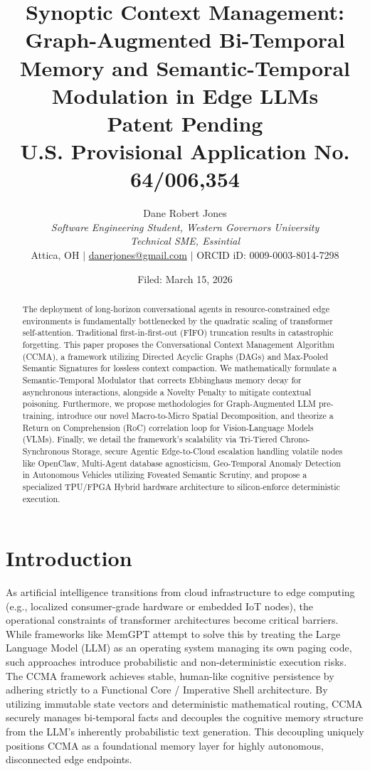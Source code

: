 \documentclass[11pt, a4paper]{article}
\title{
    \textbf{Synoptic Context Management: Graph-Augmented Bi-Temporal Memory and Semantic-Temporal Modulation in Edge LLMs} \\
    \vspace{0.5cm}
    \large \textbf{Patent Pending} \\
    \small U.S. Provisional Application No. 64/006,354
}
\author{
	Dane Robert Jones \\ 
	\textit{Software Engineering Student, Western Governors University} \\ 
	\textit{Technical SME, Essintial} \\
	Attica, OH $\vert$ \href{mailto:danerjones@gmail.com}{danerjones@gmail.com} $\vert$ ORCID iD: 0009-0003-8014-7298
}
\date{Filed: March 15, 2026}
\begin{document}
	
	\maketitle
	
	\begin{abstract}
		The deployment of long-horizon conversational agents in resource-constrained edge environments is fundamentally bottlenecked by the quadratic scaling of transformer self-attention. Traditional first-in-first-out (FIFO) truncation results in catastrophic forgetting. This paper proposes the Conversational Context Management Algorithm (CCMA), a framework utilizing Directed Acyclic Graphs (DAGs) and Max-Pooled Semantic Signatures for lossless context compaction. We mathematically formulate a Semantic-Temporal Modulator that corrects Ebbinghaus memory decay for asynchronous interactions, alongside a Novelty Penalty to mitigate contextual poisoning. Furthermore, we propose methodologies for Graph-Augmented LLM pre-training, introduce our novel Macro-to-Micro Spatial Decomposition, and theorize a Return on Comprehension (RoC) correlation loop for Vision-Language Models (VLMs). Finally, we detail the framework's scalability via Tri-Tiered Chrono-Synchronous Storage, secure Agentic Edge-to-Cloud escalation handling volatile nodes like OpenClaw, Multi-Agent database agnosticism, Geo-Temporal Anomaly Detection in Autonomous Vehicles utilizing Foveated Semantic Scrutiny, and propose a specialized TPU/FPGA Hybrid hardware architecture to silicon-enforce deterministic execution.
	\end{abstract}
	
	\vspace{0.5cm}
	
	\section{Introduction}
	As artificial intelligence transitions from cloud infrastructure to edge computing (e.g., localized consumer-grade hardware or embedded IoT nodes), the operational constraints of transformer architectures become critical barriers. While frameworks like MemGPT \cite{packer2023memgpt} attempt to solve this by treating the Large Language Model (LLM) as an operating system managing its own paging code, such approaches introduce probabilistic and non-deterministic execution risks. The CCMA framework achieves stable, human-like cognitive persistence by adhering strictly to a Functional Core / Imperative Shell architecture. By utilizing immutable state vectors and deterministic mathematical routing, CCMA securely manages bi-temporal facts and decouples the cognitive memory structure from the LLM's inherently probabilistic text generation. This decoupling uniquely positions CCMA as a foundational memory layer for highly autonomous, disconnected edge endpoints.
	
\end{document}

